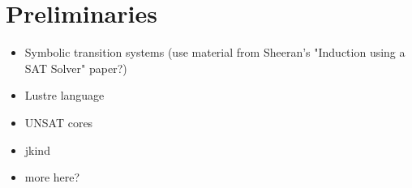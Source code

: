 \section{Preliminaries}
\label{sec:background}

\begin{itemize}
    \item Symbolic transition systems (use material from Sheeran's "Induction using a SAT Solver" paper?)
    \item Lustre language
    \item UNSAT cores
    \item jkind
    \item more here?
\end{itemize}